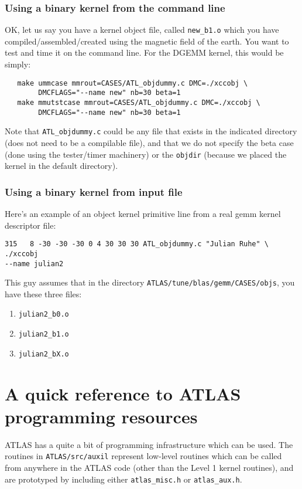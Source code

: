 \documentclass[11pt]{article}
\begin{document}
\subsubsection{Using a binary kernel from the command line}
OK, let us say you have a kernel object file, called {\tt new\_b1.o}
which you have
compiled/assembled/created using the magnetic field of the earth.  You want to
test and time it on the command line.  For the DGEMM kernel, this would be
simply:
\begin{verbatim}
   make ummcase mmrout=CASES/ATL_objdummy.c DMC=./xccobj \
        DMCFLAGS="--name new" nb=30 beta=1
   make mmutstcase mmrout=CASES/ATL_objdummy.c DMC=./xccobj \
        DMCFLAGS="--name new" nb=30 beta=1
\end{verbatim}
Note that {\tt ATL\_objdummy.c} could be any file that exists in the
indicated directory (does not need to be a compilable file), and that 
we do not specify the beta case (done using the tester/timer machinery)
or the {\tt objdir} (because we placed the kernel in the default directory).

\subsubsection{Using a binary kernel from input file}
Here's an example of an object kernel primitive line from a real gemm kernel
descriptor file:
\begin{verbatim}
315   8 -30 -30 -30 0 4 30 30 30 ATL_objdummy.c "Julian Ruhe" \
./xccobj
--name julian2
\end{verbatim}

This guy assumes that in the directory {\tt ATLAS/tune/blas/gemm/CASES/objs},
you have these three files:
\begin{enumerate}
 \item {\tt julian2\_b0.o}
 \item {\tt julian2\_b1.o}
 \item {\tt julian2\_bX.o}
\end{enumerate}

\newpage
\section{A quick reference to ATLAS programming resources}
ATLAS has a quite a bit of programming infrastructure
which can be used.
The routines in {\tt ATLAS/src/auxil} represent low-level routines
which can be called from anywhere in the ATLAS code (other than the Level 1
kernel routines), and are prototyped
by including either {\tt atlas\_misc.h} or {\tt atlas\_aux.h}.
\end{document}
